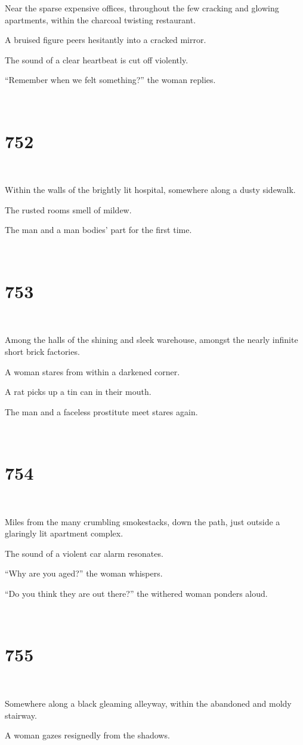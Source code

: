 \documentclass{report}
\begin{document}
Near the sparse expensive offices, throughout the few cracking and glowing apartments, within the charcoal twisting restaurant.

A bruised figure peers hesitantly into a cracked mirror.

The sound of a clear heartbeat is cut off violently.

``Remember when we felt something?'' the woman replies.

~
\chapter*{752}
~

Within the walls of the brightly lit hospital, somewhere along a dusty sidewalk.

The rusted rooms smell of mildew.

The man and a man bodies' part for the first time.

~
\chapter*{753}
~

Among the halls of the shining and sleek warehouse, amongst the nearly infinite short brick factories.

A woman stares from within a darkened corner.

A rat picks up a tin can in their mouth.

The man and a faceless prostitute meet stares again.

~
\chapter*{754}
~

Miles from the many crumbling smokestacks, down the path, just outside a glaringly lit apartment complex.

The sound of a violent car alarm resonates.

``Why are you aged?'' the woman whispers.

``Do you think they are out there?'' the withered woman ponders aloud.

~
\chapter*{755}
~

Somewhere along a black gleaming alleyway, within the abandoned and moldy stairway.

A woman gazes resignedly from the shadows.
\end{document}
